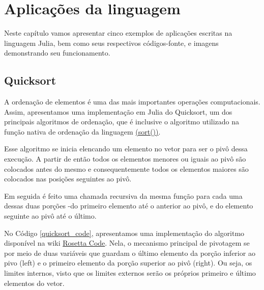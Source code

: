 %


\chapter{Aplicações da linguagem}

Neste capítulo vamos apresentar cinco exemplos de aplicações escritas na linguagem Julia, bem como seus respectivos códigos-fonte, e imagens demonstrando seu funcionamento. 

\section{Quicksort}
A ordenação de elementos é uma das mais importantes operações computacionais. Assim, apresentamos uma implementação em Julia do Quicksort, um dos principais algoritmos de ordenação, que é inclusive o algoritmo utilizado na função nativa de ordenação da linguagem \href{https://github.com/JuliaLang/julia/blob/2364748377f2a79c0485fdd5155ec2116c9f0d37/base/sort.jl#L259-L296}{(sort())}.



Esse algoritmo se inicia elencando um elemento no vetor para ser o pivô dessa execução. 
A partir de então todos os elementos menores ou iguais ao pivô são colocados antes do mesmo e consequentemente todos os elementos maiores são colocados nas posições seguintes ao pivô. 

Em seguida é feito uma chamada recursiva da mesma função para cada uma dessas duas porções -do primeiro elemento até o anterior ao pivô, e do elemento seguinte ao pivô até o último. 

No Código \ref{quicksort_code}, apresentamos uma implementação do algoritmo disponível na wiki \href{https://rosettacode.org/wiki/Sorting_algorithms/Quicksort#Julia}{Rosetta Code}. 
Nela, o mecanismo principal de pivotagem se por meio de duas variáveis que guardam o último elemento da porção inferior ao pivo (left) e o primeiro elemento da porção superior ao pivô (right). Ou seja, os limites internos, visto que os limites externos serão os próprios primeiro e último elementos do vetor. 

